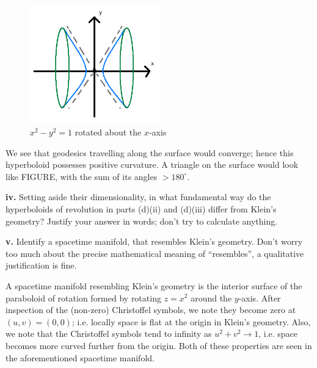 \documentclass[a4paper]{article} %
\begin{document}
\begin{figure}[h]
\centering
\includegraphics[width=0.5\textwidth]{images/diii.png}
\caption{$x^2-y^2=1$ rotated about the $x$-axis}
\label{dii figure}
\end{figure}

We see that geodesics travelling along the surface would converge; hence this hyperboloid possesses positive curvature. A triangle on the surface would look like FIGURE, with the sum of its angles $> 180^{\circ}$.



\begin{framed}
\textbf{iv.} Setting aside their dimensionality, in what fundamental way do the hyperboloids of revolution in parts (d)(ii) and (d)(iii) differ from Klein's geometry? Justify your answer in words; don’t try to calculate anything.
\end{framed}


\begin{framed}
\textbf{v.} Identify a spacetime manifold, that resembles Klein's geometry. Don’t worry too much about the precise mathematical meaning of ``resembles'', a qualitative justification is fine.
\end{framed}

A spacetime manifold  resembling Klein's geometry is the interior surface of the paraboloid of rotation formed by rotating $z=x^2$ around the $y$-axis. After inspection of the (non-zero) Christoffel symbols, we note they become zero at $(u,v)=(0,0)$; i.e. locally space is flat at the origin in Klein's geometry. Also, we note that the Christoffel symbols tend to infinity as $u^2+v^2\to 1$, i.e. space becomes more curved further from the origin. Both of these properties are seen in the aforementioned spacetime manifold.
\end{document}

